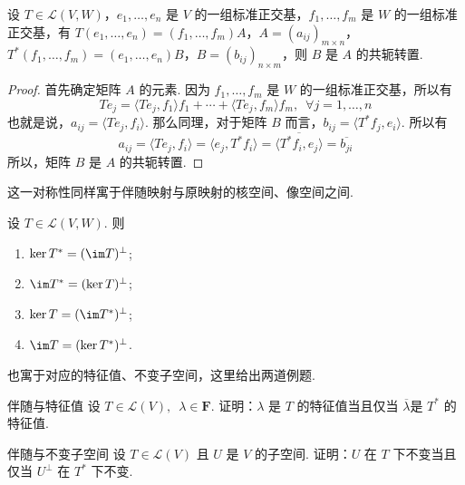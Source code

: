 \begin{theorem}{}{}
    设 $ T \in \mathcal{L}(V, W) $，$ e_1, \ldots , e_n $ 是 $ V $ 的一组标准正交基，$ f_1, \ldots , f_m $ 是 $ W $ 的一组标准正交基，有 $ T(e_1, \ldots , e_n) = (f_1, \ldots , f_m)A $，$ A = (a_{ij})_{m \times n} $，$ T^*(f_1, \ldots , f_m) =(e_1, \ldots , e_n)B $，$ B = (b_{ij})_{n \times m} $，则 $ B $ 是 $ A $ 的共轭转置.
\end{theorem}

\begin{proof}
    首先确定矩阵 $ A $ 的元素. 因为 $ f_1, \ldots , f_m $ 是 $ W $ 的一组标准正交基，所以有
    \[ Te_j = \langle Te_j, f_1 \rangle f_1 + \cdots + \langle Te_j, f_m \rangle f_m,\enspace \forall j = 1, \ldots , n \]
    也就是说，$ a_{ij} = \langle Te_j, f_i \rangle $. 那么同理，对于矩阵 $ B $ 而言，$ b_{ij} = \langle T^*f_j, e_i \rangle $. 所以有
    \[ a_{ij} = \langle Te_j, f_i \rangle = \langle e_j, T^*f_i \rangle = \overline{\langle T^*f_i, e_j \rangle} = \overline{b_{ji}} \]
    所以，矩阵 $ B $ 是 $ A $ 的共轭转置.
\end{proof}

这一对称性同样寓于伴随映射与原映射的核空间、像空间之间.

设 $ T \in \mathcal{L}(V, W) $. 则

\begin{enumerate}
    \item $ \ker T^* = (\im T)^{\perp} $;

    \item $ \im T^* = (\ker T)^{\perp} $;

    \item $ \ker T = (\im T^*)^{\perp} $;

    \item $ \im T = (\ker T^*)^{\perp} $.
\end{enumerate}

也寓于对应的特征值、不变子空间，这里给出两道例题.

\begin{example}{}{伴随与特征值}
    设 $ T \in \mathcal{L}(V),\enspace \lambda \in \mathbf{F} $. 证明：$ \lambda $ 是 $ T $ 的特征值当且仅当 $ \overline{\lambda} $是 $ T^* $ 的特征值.
\end{example}

\begin{example}{}{伴随与不变子空间}
    设 $ T \in \mathcal{L}(V) $ 且 $ U $ 是 $ V $ 的子空间. 证明：$ U $ 在 $ T $ 下不变当且仅当 $ U^{\perp} $ 在 $ T^* $ 下不变.
\end{example}

